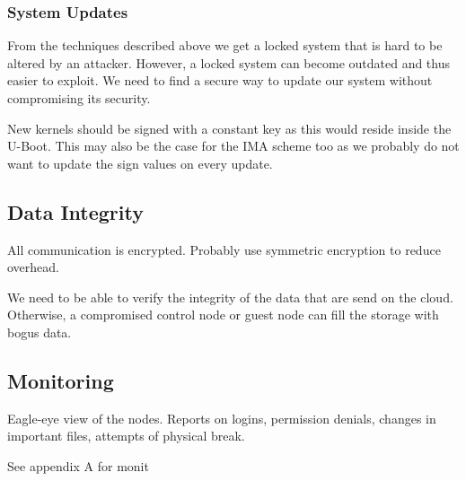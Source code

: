 \subsubsection{System Updates}

From the techniques described above we get a locked system that is hard to be altered by an attacker. However, a locked system can become outdated and thus easier to exploit. We need to find a secure way to update our system without compromising its security. 

New kernels should be signed with a constant key as this would reside inside the U-Boot. This may also be the case for the IMA scheme too as we probably do not want to update the sign values on every update.

\subsection{Data Integrity}

All communication is encrypted. Probably use symmetric encryption to reduce overhead.

We need to be able to verify the integrity of the data that are send on the cloud. Otherwise, a compromised control node or guest node can fill the storage with bogus data.

\subsection{Monitoring}

Eagle-eye view of the nodes. Reports on logins, permission denials, changes in important files, attempts of physical break.

See appendix A for monit

